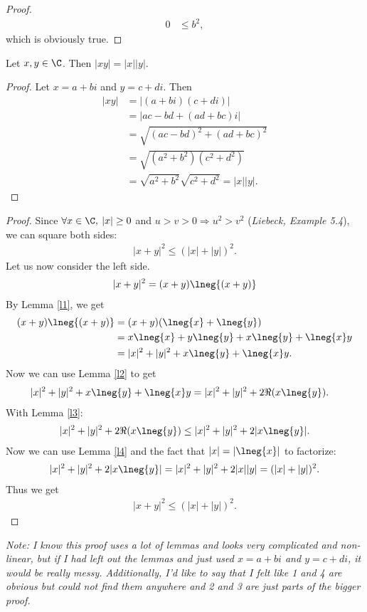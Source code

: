 \documentclass{article}
\begin{document}
\begin{adjustwidth}{2em}{0pt}
\begin{proof}
\begin{align*}
      0&\leq b^2,
    \end{align*}
    which is obviously true.
  \end{proof}
  \begin{lemma}
    \label{l4}
    Let $x,y\in\C$. Then $|xy|=|x||y|$.
  \end{lemma}
  \begin{proof}
    Let $x=a+bi$ and $y=c+di$. Then
    \begin{align*}
      |xy|&=|(a+bi)(c+di)|\\
      &=|ac-bd+(ad+bc)i|\\
      &=\sqrt{(ac-bd)^2+(ad+bc)^2}\\
      &=\sqrt{(a^2+b^2)(c^2+d^2)}\\
      &=\sqrt{a^2+b^2}\sqrt{c^2+d^2}=|x||y|.
    \end{align*} 
  \end{proof}
\end{adjustwidth}
\begin{proof}
  Since $\forall x\in\C,\:|x|\geq0$ and $u>v>0\Rightarrow u^2>v^2$ (\emph{Liebeck, Example 5.4}), we can square both sides:
  \begin{align*}
    |x+y|^2\leq (|x|+|y|)^2.
  \end{align*}
  Let us now consider the left side.
  \begin{align*}
    |x+y|^2=(x+y)\lneg{(x+y)}
  \end{align*}
  By Lemma \ref{l1}, we get
  \begin{align*}
    (x+y)\lneg{(x+y)}&=(x+y)(\lneg{x}+\lneg{y})\\
    &=x\lneg{x}+y\lneg{y}+x\lneg{y}+\lneg{x}y\\
    &=|x|^2+|y|^2+x\lneg{y}+\lneg{x}y.
  \end{align*}
  Now we can use Lemma \ref{l2} to get
  \begin{align*}
    |x|^2+|y|^2+x\lneg{y}+\lneg{x}y&=|x|^2+|y|^2+2\Re(x\lneg{y}).
  \end{align*}
  With Lemma \ref{l3}:
  \begin{align*}
    |x|^2+|y|^2+2\Re(x\lneg{y})\leq |x|^2+|y|^2+2|x\lneg{y}|.
  \end{align*}
  Now we can use Lemma \ref{l4} and the fact that $|x|=|\lneg{x}|$ to factorize:
  \begin{align*}
   |x|^2+|y|^2+2|x\lneg{y}| = |x|^2+|y|^2+2|x||y| = (|x|+|y|)^2.
  \end{align*}
  Thus we get
  \begin{align*}
    |x+y|^2\leq (|x|+|y|)^2.
  \end{align*}
\end{proof}
\emph{Note: I know this proof uses a lot of lemmas and looks very complicated and non-linear, but if I had left out the lemmas and just used $x=a+bi$ and $y=c+di$, it would be really messy. Additionally, I'd like to say that I felt like 1 and 4 are obvious but could not find them anywhere and 2 and 3 are just parts of the bigger proof.}
\end{document}
